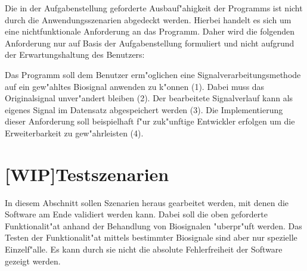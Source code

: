 Die in der Aufgabenstellung geforderte Ausbauf"ahigkeit der Programms ist nicht durch die Anwendungsszenarien abgedeckt werden.
Hierbei handelt es sich um eine nichtfunktionale Anforderung an das Programm.
Daher wird die folgenden Anforderung nur auf Basis der Aufgabenstellung formuliert und nicht aufgrund der Erwartungshaltung des Benutzers:
\begin{enumerate}[resume]
	 Das Programm soll dem Benutzer erm"oglichen eine Signalverarbeitungsmethode auf ein gew"ahltes Biosignal anwenden zu k"onnen (1).
							Dabei muss das Originalsignal unver"andert bleiben (2).
							Der bearbeitete Signalverlauf kann als eigenes Signal im Datensatz abgespeichert werden (3).
							Die Implementierung dieser Anforderung soll beispielhaft f"ur zuk"unftige Entwickler erfolgen um die Erweiterbarkeit zu gew"ahrleisten (4).
\end{enumerate}

\section{[WIP]Testszenarien}
\label{chap:testszenarien}

In diesem Abschnitt sollen Szenarien heraus gearbeitet werden, mit denen die Software am Ende validiert werden kann.
Dabei soll die oben geforderte Funktionalit"at anhand der Behandlung von Biosignalen "uberpr"uft werden.
Das Testen der Funktionalit"at mittels bestimmter Biosignale sind aber nur spezielle Einzelf"alle.
Es kann durch sie nicht die absolute Fehlerfreiheit der Software gezeigt werden.

